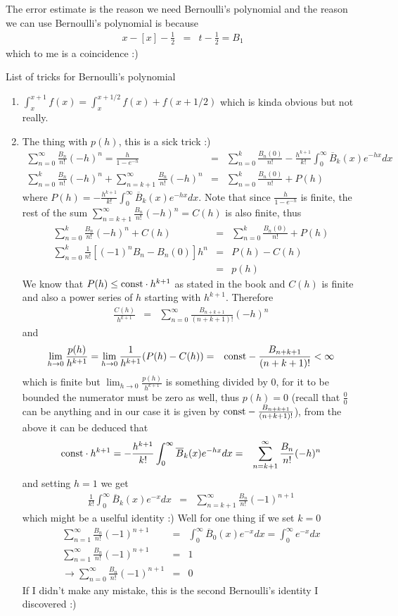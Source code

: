 \documentclass[aps,preprint,preprintnumbers,nofootinbib,showpacs,prd]{revtex4-1}
\newcommand{\nbea}{\begin{eqnarray*}}
\newcommand{\neea}{\end{eqnarray*}}
\begin{document}
The error estimate is the reason we need Bernoulli's polynomial and the reason we can use Bernoulli's polynomial is because
%
\nbea
x -[x] - \frac{1}{2} & = & t - \frac{1}{2} = B_1
\neea
%
which to me is a coincidence :)

List of tricks for Bernoulli's polynomial
%
\begin{enumerate}
%
\item $\int_x^{x + 1} f(x) = \int_x^{x+1/2} f(x) + f(x + 1/2)$ which is kinda obvious but not really.
%
\item The thing with $p(h)$, this is a sick trick :)
%
\nbea
\sum_{n=0}^\infty \frac{B_n}{n!}(-h)^n = \frac{h}{1 - e^{-h}} & = & \sum_{n = 0}^k \frac{B_n(0)}{n!} - \frac{h^{k+1}}{k!} \int_0^\infty \overline{B}_k(x) e^{-hx} dx \\
\sum_{n=0}^k \frac{B_n}{n!}(-h)^n + \sum_{n=k+1}^\infty \frac{B_n}{n!}(-h)^n & = & \sum_{n = 0}^k \frac{B_n(0)}{n!} + P(h) 
\neea
%
where $P(h) = - \frac{h^{k+1}}{k!} \int_0^\infty \overline{B}_k(x) e^{-hx} dx$. Note that since $\frac{h}{1 - e^{-h}}$ is finite, the rest of the sum $\sum_{n=k+1}^\infty \frac{B_n}{n!}(-h)^n = C(h)$ is also finite, thus
%
\nbea
\sum_{n=0}^k \frac{B_n}{n!}(-h)^n + C(h) & = & \sum_{n = 0}^k \frac{B_n(0)}{n!} + P(h)  \\
\sum_{n=0}^k \frac{1}{n!}[(-1)^nB_n - B_n(0)]h^n & = & P(h) - C(h) \\
& = & p(h)
\neea
%
We know that $P(h) \le {\rm const} \cdot h^{k+1}$ as stated in the book and $C(h)$ is finite and also a power series of $h$ starting with $h^{k+1}$. Therefore
%
\nbea
\frac{C(h)}{h^{k+1}} & = & \sum_{n = 0}^\infty \frac{B_{n+k+1}}{(n+k+1)!} (-h)^n
\neea
%
and
%
\nbea
\lim_{h\to 0} \frac{p(h)}{h^{k+1}} = \lim_{h\to 0} \frac{1}{h^{k+1}} (P(h) - C(h)) & = & {\rm const} - \frac{B_{n+k+1}}{(n+k+1)!} < \infty
\neea
%
which is finite but $\lim_{h\to0} \frac{p(h)}{h^{k+1}}$ is something divided by 0, for it to be bounded the numerator must be zero as well, thus $p(h) = 0$ (recall that $\frac{0}{0}$ can be anything and in our case it is given by ${\rm const} - \frac{B_{n+k+1}}{(n+k+1)!}$), from the above it can be deduced that
%
\nbea
{\rm const} \cdot h^{k+1} = -\frac{h^{k+1}}{k!} \int_0^\infty \overline{B}_k(x) e^{-hx} dx & = & \sum_{n = k+1}^\infty \frac{B_{n}}{n!} (-h)^n
\neea
%
and setting $h = 1$ we get
%
\nbea
\frac{1}{k!} \int_0^\infty \overline{B}_k(x) e^{-x} dx & = & \sum_{n = k+1}^\infty \frac{B_{n}}{n!} (-1)^{n+1}
\neea
%
which might be a uselful identity :) Well for one thing if we set $k=0$
%
\nbea
\sum_{n = 1}^\infty \frac{B_{n}}{n!} (-1)^{n+1} & = & \int_0^\infty \overline{B}_0 (x) e^{-x} dx = \int_0^\infty e^{-x} dx \\
\sum_{n = 1}^\infty \frac{B_{n}}{n!} (-1)^{n+1} & = & 1 \\
\to \sum_{n = 0}^\infty \frac{B_{n}}{n!} (-1)^{n+1} & = & 0
\neea
%
If I didn't make any mistake, this is the second Bernoulli's identity I discovered :)
\end{enumerate}
\end{document}
